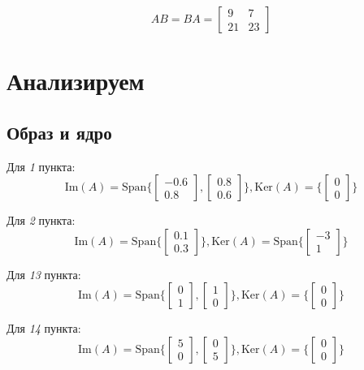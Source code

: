 \documentclass[a4paper,hidelinks,14pt]{extarticle}
\newcommand{\Span}{\text{Span}}
\newcommand{\Img}{\text{Im}}
\newcommand{\Ker}{\text{Ker}}
\begin{document}
	$$
	AB = BA = \begin{bmatrix}
		9 & 7 \\
		21 & 23
	\end{bmatrix}
	$$
	
	\section{Анализируем}
	\subsection{Образ и ядро}
	Для \textit{1} пункта: $$\Img(A) = \Span\{\begin{bmatrix}
		-0.6 \\ 0.8
	\end{bmatrix}, \begin{bmatrix}
		0.8 \\ 0.6
	\end{bmatrix}\}, \Ker(A)=\{\begin{bmatrix}
	0 \\ 0
	\end{bmatrix}\}$$
	
	Для \textit{2} пункта: $$\Img(A) = \Span\{\begin{bmatrix}
		0.1 \\ 0.3
	\end{bmatrix}\}, \Ker(A)=\Span\{\begin{bmatrix}
		-3 \\ 1
	\end{bmatrix}\}$$
	
	Для \textit{13} пункта: 
	$$\Img(A) = \Span\{\begin{bmatrix}
		0 \\ 1
	\end{bmatrix}, \begin{bmatrix}
		1 \\ 0
	\end{bmatrix}\}, \Ker(A)=\{\begin{bmatrix}
		0 \\ 0
	\end{bmatrix}\}$$
	
	Для \textit{14} пункта: 
	$$\Img(A) = \Span\{\begin{bmatrix}
		5 \\ 0
	\end{bmatrix}, \begin{bmatrix}
		0 \\ 5
	\end{bmatrix}\}, \Ker(A)=\{\begin{bmatrix}
		0 \\ 0
	\end{bmatrix}\}$$
	
\end{document}
